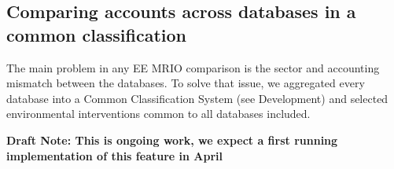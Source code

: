 \subsection{Comparing accounts across databases in a common classification}

The main problem in any EE MRIO comparison is the sector and accounting
mismatch between the databases. To solve that issue, we aggregated every
database into a Common Classification System (see Development) and
selected environmental interventions common to all databases included.

\textbf{Draft Note: This is ongoing work, we expect a first running implementation of this feature in April}
